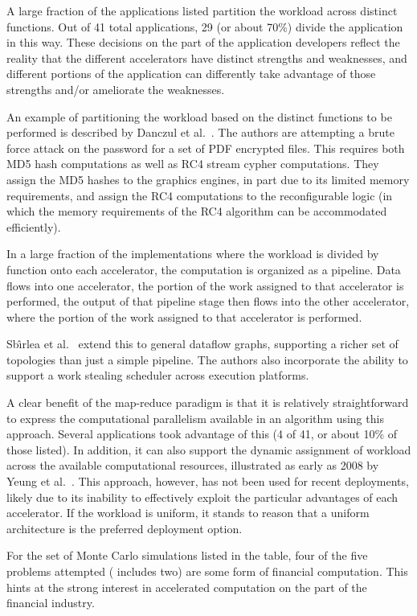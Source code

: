 A large fraction of the applications listed partition the
workload across distinct functions. Out of 41 total applications, 29
(or about 70\%)
divide the application in this way.  These decisions on the part of the
application developers reflect the reality that the different accelerators
have distinct strengths and weaknesses, and different portions of the
application can differently take advantage of those strengths and/or
ameliorate the weaknesses.

An example of partitioning the workload based on the distinct functions to be
performed is described by Danczul et al.~\cite{dfg+13}. The authors are
attempting a brute force attack on the password for a set of PDF encrypted
files.  This requires both MD5 hash computations as well as RC4 stream cypher 
computations.  They assign the MD5 hashes to the graphics engines, in part
due to its limited memory requirements, and assign the RC4 computations to the
reconfigurable logic (in which the memory requirements of the RC4 algorithm
can be accommodated efficiently).

In a large fraction of the implementations where the workload is
divided by function onto each accelerator, the computation is 
organized as a pipeline.  Data flows into one accelerator, the portion
of the work assigned to that accelerator is performed, the output
of that pipeline stage then flows into the other accelerator, where
the portion of the work assigned to that accelerator is performed.

Sb\^{\i}rlea et al.~\cite{szb+12} extend this to general dataflow graphs,
supporting a richer set of topologies than just a simple pipeline.  The authors
also incorporate the ability to support a work stealing scheduler across
execution platforms.

A clear benefit of the map-reduce paradigm is that it is relatively
straightforward to express the computational parallelism available in
an algorithm using this approach.  Several applications took advantage
of this (4 of 41, or about 10\% of those listed).
In addition, it can also support the dynamic assignment of
workload across the available computational resources, illustrated as
early as 2008 by Yeung et al.~\cite{ytt+08}.
This approach, however, has not been used for recent deployments, likely
due to its inability to effectively exploit the particular advantages
of each accelerator. If the workload is uniform, it stands to reason that
a uniform architecture is the preferred deployment option.

For the set of Monte Carlo simulations listed in the table,
four of the five problems attempted
(\cite{tttl10} includes two) are some form of financial computation.
This hints at the strong interest in accelerated computation on the
part of the financial industry.

